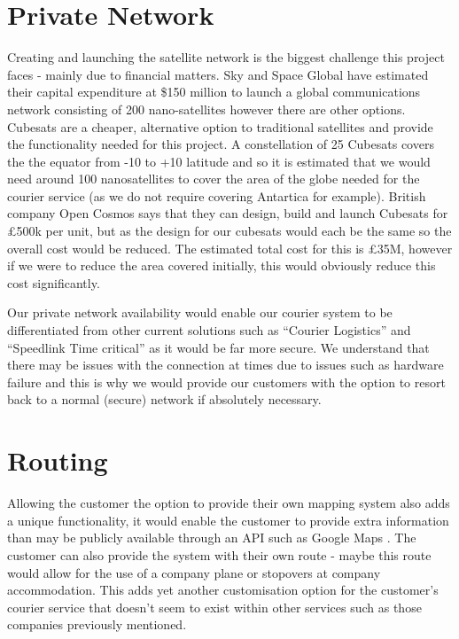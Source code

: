 


\section{Private Network}

Creating and launching the satellite network is the biggest challenge this project faces - mainly due to financial matters. Sky and Space Global have estimated their capital expenditure at \$150 million to launch a global communications network consisting of 200 nano-satellites \cite{nanosatcost} however there are other options. Cubesats \cite{cubsesat} are a cheaper, alternative option to traditional satellites and provide the functionality needed for this project. A constellation of 25 Cubesats covers the the equator from -10 to +10 latitude \cite{narayanasamy2017nanosatellites} and so it is estimated that we would need around 100 nanosatellites to cover the area of the globe needed for the courier service (as we do not require covering Antartica for example). British company Open Cosmos says that they can design, build and launch Cubesats for £500k per unit, but as the design for our cubesats would each be the same so the overall cost would be reduced. The estimated total cost for this is £35M, however if we were to reduce the area covered initially, this would obviously reduce this cost significantly.

Our private network availability would enable our courier system to be differentiated from other current solutions such as “Courier Logistics” \cite{courierlogistics_2019} and “Speedlink Time critical” \cite{speedlinktc} as it would be far more secure. We understand that there may be issues with the connection at times due to issues such as hardware failure and this is why we would provide our customers with the option to resort back to a normal (secure) network if absolutely necessary. 

\section{Routing}

Allowing the customer the option to provide their own mapping system also adds a unique functionality, it would enable the customer to provide extra information than may be publicly available through an API such as Google Maps \cite{GoogleMaps}. The customer can also provide the system with their own route - maybe this route would allow for the use of a company plane or stopovers at company accommodation. This adds yet another customisation option for the customer's courier service that doesn't seem to exist within other services such as those companies previously mentioned.

